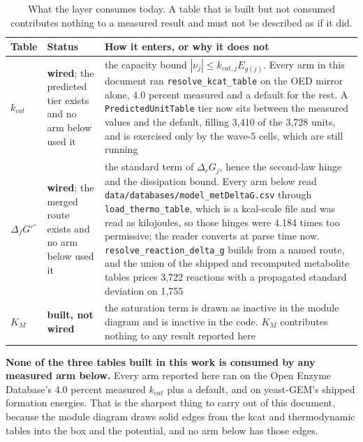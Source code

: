 \begin{table}[H]
  \centering
  \footnotesize
  \caption[Wired against built]{What the layer consumes today. A table that is built but
  not consumed contributes nothing to a measured result and must not be described as if it
  did.}
  \label{tab:wired}
  \begin{tabular}{@{}p{}p{}p{}@{}}
    \hline
    Table & Status & How it enters, or why it does not \\
    \hline
    $k_{cat}$ & \textbf{wired}; the predicted tier exists and no arm below used it &
      the capacity bound $|\nu_j| \le k_{cat,j} E_{g(j)}$. Every arm in this document ran
      \texttt{resolve\_kcat\_table} on the OED mirror alone, 4.0 percent measured and a
      default for the rest. A \texttt{PredictedUnitTable} tier now sits between the measured
      values and the default, filling 3{,}410 of the 3{,}728 units, and is exercised only by
      the wave-5 cells, which are still running \\
    $\Delta_f G'^{\circ}$ & \textbf{wired}; the merged route exists and no arm below used it &
      the standard term of $\Delta_r G_j$, hence the second-law hinge and the dissipation
      bound. Every arm below read
      \texttt{data/databases/model\_metDeltaG.csv} through \texttt{load\_thermo\_table},
      which is a kcal-scale file and was read as kilojoules, so those hinges were 4.184
      times too permissive; the reader converts at parse time now.
      \texttt{resolve\_reaction\_delta\_g} builds from a named route, and the union of
      the shipped and recomputed metabolite tables prices 3{,}722 reactions with a
      propagated standard deviation on 1{,}755 \\
    $K_M$ & \textbf{built, not wired} &
      the saturation term is drawn as inactive in the module diagram and is inactive in the
      code. $K_M$ contributes nothing to any result reported here \\
    \hline
  \end{tabular}
\end{table}

\textbf{None of the three tables built in this work is consumed by any measured arm below.}
Every arm reported here ran on the Open Enzyme Database's 4.0 percent measured $k_{cat}$
plus a default, and on yeast-GEM's shipped formation energies. That is the sharpest thing to
carry out of this document, because the module diagram draws solid edges from the kcat and
thermodynamic tables into the box and the potential, and no arm below has those edges.

